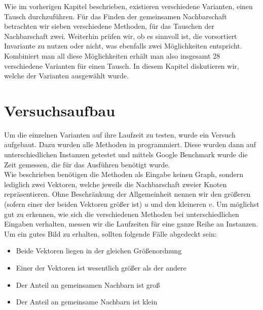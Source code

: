 \label{cap:tests}
Wie im vorherigen Kapitel beschrieben, existieren verschiedene Varianten, einen \gc{} Tausch 
durchzuführen. Für das Finden der gemeinsamen Nachbarschaft betrachten wir sieben verschiedene Methoden, 
für das Tauschen der Nachbarschaft zwei. Weiterhin prüfen wir, ob es sinnvoll ist, 
die vorsortiert Invariante zu nutzen oder nicht, was ebenfalls zwei Möglichkeiten entspricht.
Kombiniert man all diese Möglichkeiten erhält man also insgesamt 28 verschiedene Varianten für einen \gc{} 
Tausch.
In diesem Kapitel diskutieren wir, welche der Varianten ausgewählt wurde.

\section{Versuchsaufbau}
Um die einzelnen Varianten auf ihre Laufzeit zu testen, wurde ein Versuch aufgebaut.
Dazu wurden alle Methoden in \cpp programmiert. Diese wurden dann auf unterschiedlichen
Instanzen getestet und mittels Google Benchmark \cite{benchmark} wurde die Zeit gemessen, 
die für das Ausführen benötigt wurde.
\\

Wie %
beschrieben benötigen die Methoden als Eingabe keinen Graph, 
sondern lediglich zwei Vektoren, welche jeweils die Nachbarschaft zweier Knoten repräsentieren. Ohne 
Beschränkung der Allgemeinheit nennen wir den größeren (sofern einer der beiden Vektoren größer ist)
$u$ und den kleineren $v$.
Um möglichst gut zu erkennen, wie sich die verschiedenen Methoden bei unterschiedlichen
Eingaben verhalten, messen wir die Laufzeiten für eine ganze Reihe an Instanzen. 
Um ein gutes Bild zu erhalten, sollten folgende Fälle abgedeckt sein:

\begin{itemize}
	\item Beide Vektoren liegen in der gleichen Größenordnung
	
	\item Einer der Vektoren ist wesentlich größer als der andere
	
	\item Der Anteil an gemeinsamen Nachbarn ist groß
	
	\item Der Anteil an gemeinsame Nachbarn  ist klein
\end{itemize}

